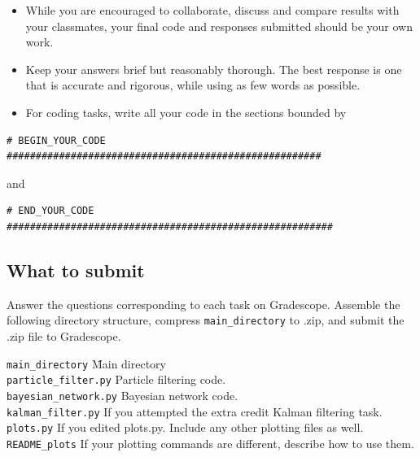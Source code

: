 \documentclass[a4paper]{article}
\theoremstyle{definition}
\theoremstyle{plain}
\begin{document}
\begin{itemize}
    \item While you are encouraged to collaborate, discuss and compare results with your classmates, your final code and responses submitted should be your own work.
    \item Keep your answers brief but reasonably thorough. The best response is one that is accurate and rigorous, while using as few words as possible.
    \item For coding tasks, write all your code in the sections bounded by
\end{itemize}

\begin{verbatim}
# BEGIN_YOUR_CODE ######################################################
\end{verbatim}
and
\begin{verbatim}
# END_YOUR_CODE ########################################################
\end{verbatim}

\subsection*{What to submit}

Answer the questions corresponding to each task on Gradescope. Assemble the following directory structure, compress \texttt{main\_directory} to .zip, and submit the .zip file to Gradescope.

\begin{tabbing}
    \texttt{main\_directory} \hspace{5em} \= Main directory \\
    \hspace{1em}\texttt{particle\_filter.py} \> Particle filtering code. \\
    \hspace{1em}\texttt{bayesian\_network.py} \> Bayesian network code.\\
    \hspace{1em}\texttt{kalman\_filter.py} \> If you attempted the extra credit Kalman filtering task.\\
    \hspace{1em}\texttt{plots.py} \> If you edited plots.py. Include any other plotting files as well.\\
    \hspace{1em}\texttt{README\_plots} \> If your plotting commands are different, describe how to use them.
\end{tabbing}
\end{document}
